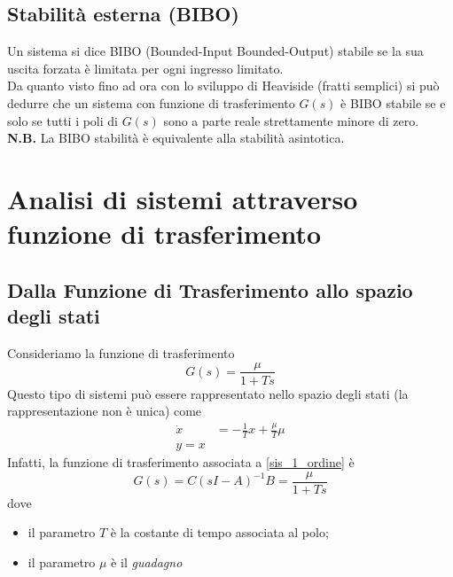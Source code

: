 \documentclass{article}
\numberwithin{equation}{subsection}
\let\oldsection\section%
\renewcommand{\section}{%
  \renewcommand{\theequation}{\thesection.\arabic{equation}}%
  \oldsection}%
\let\oldsubsection\subsection%
\renewcommand{\subsection}{%
  \renewcommand{\theequation}{\thesubsection.\arabic{equation}}%
  \oldsubsection}%
\begin{document}
\subsection{Stabilità esterna (BIBO)}
Un sistema si dice BIBO (Bounded-Input Bounded-Output) stabile se la sua uscita forzata è limitata per ogni ingresso limitato.
\vspace*{0.1cm}\\
Da quanto visto fino ad ora con lo sviluppo di Heaviside (fratti semplici) si può dedurre che un sistema con funzione di trasferimento $G(s)$ è BIBO stabile se e solo se tutti i poli di $G(s)$ sono a parte reale strettamente minore di zero.
\vspace*{0.1cm}\\
\textbf{N.B.} La BIBO stabilità è equivalente alla stabilità asintotica. 



\section{Analisi di sistemi attraverso funzione di trasferimento}


\subsection{Dalla Funzione di Trasferimento allo spazio degli stati}
Consideriamo la funzione di trasferimento
\[
    G(s) = \frac{\mu}{1+T s}
\]  
Questo tipo di sistemi può essere rappresentato nello spazio degli stati (la rappresentazione non è unica) come
\begin{align}\label{sis_1_ordine}
    \dot x &= - \frac{1}{T} x + \frac{\mu}{T}\mu
    \\
    y = x
\end{align}
Infatti, la funzione di trasferimento associata a \ref{sis_1_ordine} è 
\[
    G(s) = C(sI-A)^{-1} B = \frac{\mu}{1+Ts}
\]
dove 
\begin{itemize}
    \item il parametro $T$ è la costante di tempo associata al polo;
    \item il parametro $\mu$ è il \textit{guadagno}
\end{itemize}
\end{document}
